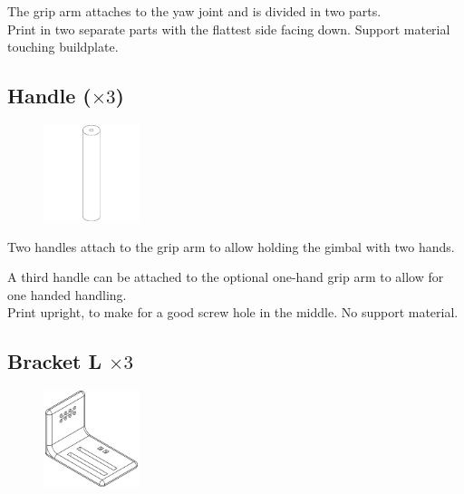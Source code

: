 The grip arm attaches to the yaw joint and is divided in two parts.\\

\raisebox{-0.2cm}{\hspace{-1.5cm}\Huge\Info}\normalsize \quad Print in two separate parts with the flattest side facing down. Support material touching buildplate.


\subsection{Handle ($\times3$)}	

\begin{figure}
    \vspace{-2cm}
    \includegraphics[width=0.25\textwidth]{PrintedParts/handle.PNG}
\end{figure}

Two handles attach to the grip arm to allow holding the gimbal with two hands. 

A third handle can be attached to the optional one-hand grip arm to allow for one handed handling.\\

\raisebox{-0.2cm}{\hspace{-1.5cm}\Huge\Info}\normalsize \quad Print upright, to make for a good screw hole in the middle. No support material.


\subsection{Bracket L $\times3$}
\begin{figure}
    \vspace{-1cm}
    \includegraphics[width=0.25\textwidth]{PrintedParts/bracket_L.PNG}
\end{figure}

